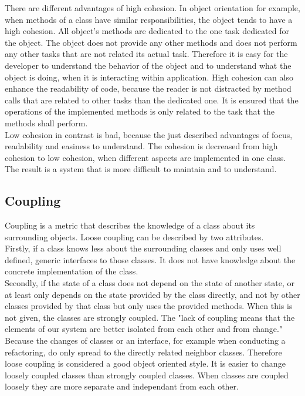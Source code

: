 There are different advantages of high cohesion. In object orientation for example, when methods of a class have similar responsibilities, the object tends to have a high cohesion. All object's methods are dedicated to the one task dedicated for the object. The object does not provide any other methods and does not perform any other tasks that are not related its actual task. Therefore it is easy for the developer to understand the behavior of the object and to understand what the object is doing, when it is interacting within application. High cohesion can also enhance the readability of code, because the reader is not distracted by method calls that are related to other tasks than the dedicated one. It is ensured that the operations of the implemented methods is only related to the task that the methods shall perform. \\

Low cohesion in contrast is bad, because the just described advantages of focus, readability and easiness to understand. The cohesion is decreased from high cohesion to low cohesion, when different aspects are implemented in one class. The result is a system that is more difficult to maintain and to understand. 

\subsection*{Coupling}
\label{coupling}
Coupling is a metric that describes the knowledge of a class about its surrounding objects. Loose coupling can be described by two attributes. 
\\
Firstly, if a class knows less about the surrounding classes and only uses well defined, generic interfaces to those classes. It does not have knowledge about the concrete implementation of the class. 
\\
Secondly, if the state of a class does not depend on the state of another state, or at least only depends on the state provided by the class directly, and not by other classes provided by that class but only uses the provided methods. 
When this is not given, the classes are strongly coupled. The "lack of coupling means that the elements of our system are better isolated from each other and from change." \cite[Loose Coupling]{wiki}
Because the changes of classes or an interface, for example when conducting a refactoring, do only spread to the directly related neighbor classes. Therefore loose coupling is considered a good object oriented style. It is easier to change loosely coupled classes than strongly coupled classes. When classes are coupled loosely they are more separate and independant from each other. 
\\


